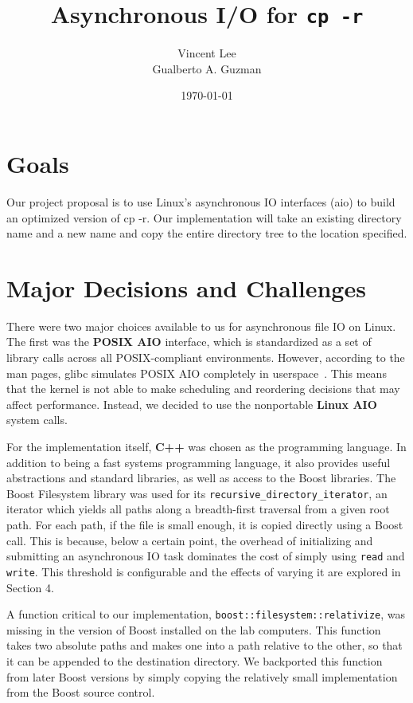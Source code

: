 \documentclass[11pt]{article}
\begin{document}
\title{Asynchronous I/O for \texttt{cp -r}}
\date{\today}
\author{Vincent Lee \\
        Gualberto A. Guzman}

\maketitle

\section{Goals}

Our project proposal is to use Linux's asynchronous IO interfaces (aio) to build
an optimized version of cp -r. Our implementation will take an existing
directory name and a new name and copy the entire directory tree to the location
specified.

\section{Major Decisions and Challenges} 

There were two major choices available to us for asynchronous file IO on Linux.
The first was the \textbf{POSIX AIO} interface, which is standardized as a set
of library calls across all POSIX-compliant environments. However, according to
the man pages, glibc simulates POSIX AIO completely in userspace~\cite{aio7}.
This means that the kernel is not able to make scheduling and reordering
decisions that may affect performance. Instead, we decided to use the
nonportable \textbf{Linux AIO} system calls.

For the implementation itself, \textbf{C++} was chosen as the programming
language. In addition to being a fast systems programming language, it also
provides useful abstractions and standard libraries, as well as access to the
Boost libraries. The Boost Filesystem library was used for its
\texttt{recursive\_directory\_iterator}, an iterator which yields all paths
along a breadth-first traversal from a given root path. For each path, if the
file is small enough, it is copied directly using a Boost call. This is because,
below a certain point, the overhead of initializing and submitting an
asynchronous IO task dominates the cost of simply using \texttt{read} and
\texttt{write}. This threshold is configurable and the effects of varying it are
explored in Section 4.

A function critical to our implementation,
\texttt{boost::filesystem::relativize}, was missing in the version of Boost
installed on the lab computers. This function takes two absolute paths and makes
one into a path relative to the other, so that it can be appended to the
destination directory. We backported this function from later Boost versions by
simply copying the relatively small implementation from the Boost source
control.
\end{document}
